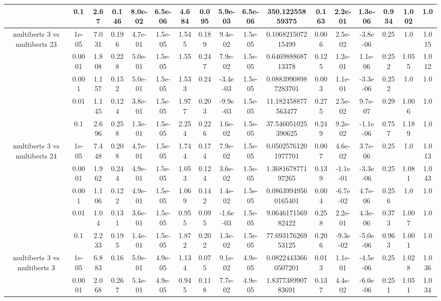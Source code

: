 \begin{tabular}{|c|c|c|c|c|c|c|c|c|c|c|c|c|c|c|c|c|}
 & 0.1 & 2.67 & 0.146 & 8.0e-02 & 6.5e-06 & 4.684 & 0.095 & 5.9e-03 & 6.5e-06 & 350.12255859375 & 0.163 & 2.2e-01 & 1.3e-06 & 0.934 & 1.002 & 1.0 \\
\hline
\multirow{5}{*}{multiberts 3 vs multiberts 23} & 1e-05 & 7.031 & 0.196 & 4.7e-01 & 1.5e-05 & 1.545 & 0.189 & 9.4e-02 & 1.5e-05 & 0.106821507215499 & 0.006 & 2.5e-02 & -3.8e-06 & 0.25 & 1.0 & 1.015 \\
 & 0.0001 & 1.808 & 0.228 & 5.0e-01 & 1.5e-05 & 1.55 & 0.247 & 7.9e-02 & 1.5e-05 & 0.646988868713378 & 0.125 & 1.2e-01 & 1.1e-06 & 0.252 & 1.055 & 1.012 \\
 & 0.001 & 1.157 & 0.152 & 5.0e-01 & 1.5e-05 & 1.533 & 0.24 & -3.4e-03 & 1.5e-05 & 0.08839908987283701 & 0.003 & 1.1e-01 & -3.3e-06 & 0.252 & 1.0 & 1.0 \\
 & 0.01 & 1.145 & 0.124 & 3.8e-01 & 1.5e-05 & 1.977 & 0.203 & -9.9e-03 & 1.5e-05 & 11.182458877563477 & 0.275 & 2.5e-02 & 9.7e-07 & 0.29 & 1.006 & 1.0 \\
 & 0.1 & 2.696 & 0.258 & 1.3e-01 & 1.5e-05 & 2.254 & 0.226 & 1.6e-02 & 1.5e-05 & 37.546051025390625 & 0.249 & 9.2e-02 & -1.1e-06 & 0.757 & 1.189 & 1.0 \\
\hline
\multirow{5}{*}{multiberts 3 vs multiberts 24} & 1e-05 & 7.448 & 0.208 & 4.7e-01 & 1.5e-05 & 1.744 & 0.174 & 7.9e-02 & 1.5e-05 & 0.05025761201977701 & 0.007 & 4.6e-02 & 3.7e-06 & 0.25 & 1.0 & 1.013 \\
 & 0.0001 & 1.962 & 0.244 & 4.9e-01 & 1.5e-05 & 1.053 & 0.124 & 3.6e-02 & 1.5e-05 & 1.368167877197265 & 0.139 & -1.1e-01 & -3.3e-06 & 0.25 & 1.081 & 1.043 \\
 & 0.001 & 1.106 & 0.122 & 4.9e-01 & 1.5e-05 & 1.069 & 0.142 & 1.4e-02 & 1.5e-05 & 0.08639949560165401 & 0.004 & -6.7e-02 & 4.7e-06 & 0.256 & 1.0 & 1.0 \\
 & 0.01 & 1.04 & 0.131 & 3.6e-01 & 1.5e-05 & 0.955 & 0.095 & -1.6e-03 & 1.5e-05 & 9.064617156982422 & 0.258 & 2.2e-01 & 4.3e-06 & 0.373 & 1.007 & 1.0 \\
 & 0.1 & 2.233 & 0.195 & 1.4e-01 & 1.5e-05 & 1.872 & 0.202 & 1.3e-02 & 1.5e-05 & 77.69317626953125 & 0.206 & -9.3e-02 & -5.0e-06 & 0.963 & 1.001 & 1.0 \\
\hline
\multirow{5}{*}{multiberts 3 vs multiberts 3} & 1e-05 & 6.883 & 0.16 & 5.0e-01 & 4.9e-05 & 1.134 & 0.075 & 9.1e-02 & 4.9e-05 & 0.08224433660507201 & 0.013 & 1.1e-01 & -4.5e-06 & 0.25 & 1.028 & 1.036 \\
 & 0.0001 & 2.068 & 0.267 & 5.4e-01 & 4.9e-05 & 0.945 & 0.118 & 7.7e-02 & 4.9e-05 & 1.837738990783691 & 0.137 & 4.4e-02 & -6.0e-06 & 0.251 & 1.051 & 1.034 \\

\end{tabular}
